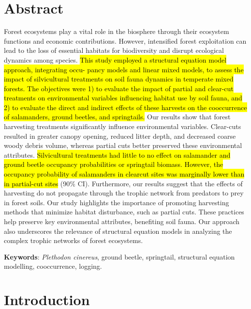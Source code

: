 \clearpage

\section*{Abstract}
\label{sec:abstract1}

Forest ecosystems play a vital role in the biosphere through their ecosystem functions and economic contributions. 
However, intensified forest exploitation can lead to the loss of essential habitats for biodiversity and disrupt ecological dynamics among species. 
\hl{This study employed a structural equation model approach, integrating occu- pancy models and linear mixed models, 
to assess the impact of silvicultural treatments on soil fauna dynamics in temperate mixed forests. 
The objectives were 1) to evaluate the impact of partial and clear-cut treatments on environmental variables influencing habitat use by soil fauna, 
and 2) to evaluate the direct and indirect effects of these harvests on the cooccurrence of salamanders, ground beetles, and springtails.}
Our results show that forest harvesting treatments significantly influence environmental variables. 
Clear-cuts resulted in greater canopy opening, reduced litter depth, and decreased coarse woody debris volume, whereas partial cuts better preserved these environmental attributes. 
\hl{Silvicultural treatments had little to no effect on salamander and ground beetle occupancy probabilities or springtail biomass. However, the occupancy probability of salamanders in clearcut sites was marginally lower than in partial-cut sites }(90\% CI). 
Furthermore, our results suggest that the effects of harvesting do not propagate through the trophic network from predators to prey in forest soils. 
Our study highlights the importance of promoting harvesting methods that minimize habitat disturbance, such as partial cuts. 
These practices help preserve key environmental attributes, benefiting soil fauna. 
Our approach also underscores the relevance of structural equation models in analyzing the complex trophic networks of forest ecosystems.

\textbf{Keywords}: \textit{Plethodon cinereus}, ground beetle, springtail, structural equation modelling, cooccurrence, logging.


\cleardoublepage

\section*{Introduction}
\label{sec:intro1}

